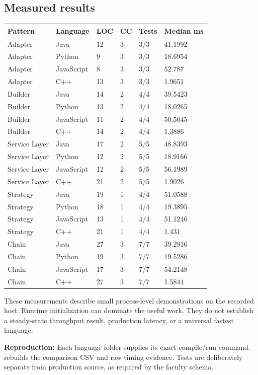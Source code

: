 \documentclass[11pt,a4paper]{article}
\newcommand{\entry}[2]{\textbf{#1:} #2\par}
\newcommand{\code}[1]{\texttt{\detokenize{#1}}}
\begin{document}
\subsection{Measured results}
{\small
\begin{tabularx}{\linewidth}{@{}Lp{22mm}p{10mm}p{9mm}p{14mm}p{22mm}@{}}\toprule
Pattern & Language & LOC & CC & Tests & Median ms\\\midrule
Adapter & Java & 12 & 3 & 3/3 & 41.1992\\
Adapter & Python & 9 & 3 & 3/3 & 18.6954\\
Adapter & JavaScript & 8 & 3 & 3/3 & 52.787\\
Adapter & C++ & 13 & 3 & 3/3 & 1.9651\\
Builder & Java & 14 & 2 & 4/4 & 39.5423\\
Builder & Python & 13 & 2 & 4/4 & 18.0265\\
Builder & JavaScript & 11 & 2 & 4/4 & 50.5045\\
Builder & C++ & 14 & 2 & 4/4 & 1.3886\\
Service Layer & Java & 17 & 2 & 5/5 & 48.8393\\
Service Layer & Python & 12 & 2 & 5/5 & 18.9166\\
Service Layer & JavaScript & 12 & 2 & 5/5 & 56.1989\\
Service Layer & C++ & 21 & 2 & 5/5 & 1.9026\\
Strategy & Java & 19 & 1 & 4/4 & 51.0588\\
Strategy & Python & 18 & 1 & 4/4 & 19.3895\\
Strategy & JavaScript & 13 & 1 & 4/4 & 51.1246\\
Strategy & C++ & 21 & 1 & 4/4 & 1.431\\
Chain & Java & 27 & 3 & 7/7 & 39.2916\\
Chain & Python & 19 & 3 & 7/7 & 19.5286\\
Chain & JavaScript & 17 & 3 & 7/7 & 54.2148\\
Chain & C++ & 27 & 3 & 7/7 & 1.5844\\
\bottomrule\end{tabularx}
}
These measurements describe small process-level demonstrations on the recorded host. Runtime initialization can dominate the useful work. They do not establish a steady-state throughput result, production latency, or a universal fastest language.

\entry{Reproduction}{Each language folder supplies its exact compile/run command. \code{tools/measure.py} rebuilds the comparison CSV and raw timing evidence. Tests are deliberately separate from production source, as required by the faculty schema.}
\clearpage
\end{document}
